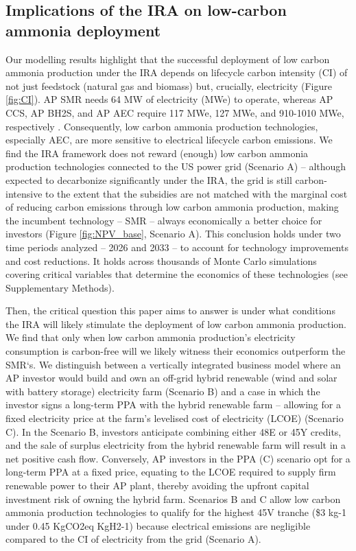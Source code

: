 \documentclass{article}
\begin{document}
\subsection*{Implications of the IRA on low-carbon ammonia deployment}
Our modelling results highlight that the successful deployment of low carbon ammonia production under the IRA depends on lifecycle carbon intensity (CI) of not just feedstock (natural gas and biomass) but, crucially, electricity (Figure \ref{fig:CI}). AP SMR needs 64 MW of electricity (MWe) to operate, whereas AP CCS, AP BH2S, and AP AEC require 117 MWe, 127 MWe, and 910-1010 MWe, respectively . Consequently, low carbon ammonia production technologies, especially AEC, are more sensitive to electrical lifecycle carbon emissions. We find the IRA framework does not reward (enough) low carbon ammonia production technologies connected to the US power grid (Scenario A) – although expected to decarbonize significantly under the IRA, the grid is still carbon-intensive to the extent that the subsidies are not matched with the marginal cost of reducing carbon emissions through low carbon ammonia production, making the incumbent technology – SMR – always economically a better choice for investors (Figure \ref{fig:NPV_base}, Scenario A). This conclusion holds under two time periods analyzed – 2026 and 2033 – to account for technology improvements and cost reductions. It holds across thousands of Monte Carlo simulations covering critical variables that determine the economics of these technologies  (see Supplementary Methods). 

Then, the critical question this paper aims to answer is under what conditions the IRA will likely stimulate the deployment of low carbon ammonia production. We find that only when low carbon ammonia production’s electricity consumption is carbon-free will we likely witness their economics outperform the SMR‘s. We distinguish between a vertically integrated business model where an AP investor would build and own an off-grid hybrid renewable (wind and solar with battery storage) electricity farm (Scenario B) and a case in which the investor signs a long-term PPA with the hybrid renewable farm – allowing for a fixed electricity price at the farm’s levelised cost of electricity (LCOE) (Scenario C). In the Scenario B, investors anticipate combining either 48E or 45Y credits, and the sale of surplus electricity from the hybrid renewable farm will result in a net positive cash flow. Conversely, AP investors in the PPA (C) scenario opt for a long-term PPA at a fixed price, equating to the LCOE required to supply firm renewable power to their AP plant, thereby avoiding the upfront capital investment risk of owning the hybrid farm. Scenarios B and C allow low carbon ammonia production technologies to qualify for the highest 45V tranche (\$3 kg-1 under 0.45 KgCO2eq KgH2-1) because electrical emissions are negligible compared to the CI of electricity from the grid (Scenario A).
\end{document}
